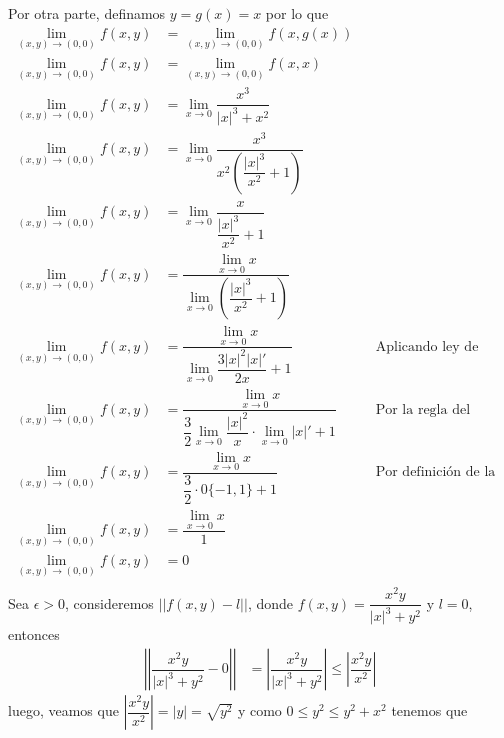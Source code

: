 \documentclass[letterpaper]{article}
\providecommand{\abs}[1]{\left|#1\right|}
\providecommand{\norm}[1]{\left|\left|#1\right|\right|}
\renewcommand{\*}{\cdot}
\theoremstyle{definition}
\begin{document}
Por otra parte, definamos $ y = g(x) = x$ por lo que
\begin{align*}
	\lim\limits_{(x,y)\to (0,0)} f(x,y) &= \lim\limits_{(x,y) \to (0,0)} f(x,g(x))\\
	\lim\limits_{(x,y)\to (0,0)} f(x,y) &= \lim\limits_{(x,y) \to (0,0)} f(x,x)\\
	\lim\limits_{(x,y)\to (0,0)} f(x,y) &= \lim\limits_{x \to 0} \dfrac{x^3}{\vert x \vert^3 + x^2} \\
	\lim\limits_{(x,y)\to (0,0)} f(x,y) &= \lim\limits_{x \to 0} \dfrac{x^3}{x^2  \left( \dfrac{\abs{x}^3}{x^2} + 1 \right) } \\
	\lim\limits_{(x,y)\to (0,0)} f(x,y) &= \lim\limits_{x \to 0} \dfrac{x}{\dfrac{\abs{x}^3}{x^2} + 1 } \\
	\lim\limits_{(x,y)\to (0,0)} f(x,y) &=  \dfrac{\lim\limits_{x \to 0} x}{\lim\limits_{x \to 0} \left( \dfrac{\abs{x}^3}{x^2} + 1 \right) } \\
	\lim\limits_{(x,y)\to (0,0)} f(x,y) &=  \dfrac{\lim\limits_{x \to 0} x}{\lim\limits_{x \to 0}  \dfrac{3\abs{x}^2 \abs{x}'}{2x} + 1  }  && \text{Aplicando ley de L'Hôpital}\\
	\lim\limits_{(x,y)\to (0,0)} f(x,y) &=  \dfrac{\lim\limits_{x \to 0} x}{ \dfrac{3}{2} \lim\limits_{x \to 0}  \dfrac{\abs{x}^2}{x}\* \lim\limits_{x \to 0} \abs{x}'  + 1  }  && \text{Por la regla del producto}\\
	\lim\limits_{(x,y)\to (0,0)} f(x,y) &=  \dfrac{\lim\limits_{x \to 0} x}{ \dfrac{3}{2} \* 0\{-1,1\}  + 1  }  && \text{Por definición de la derivada del valor absoluto }\\
	\lim\limits_{(x,y)\to (0,0)} f(x,y) &=  \dfrac{\lim\limits_{x \to 0} x}{1}  && \text{}\\
	\lim\limits_{(x,y)\to (0,0)} f(x,y) &=  0 && \text{}\\
\end{align*}
Sea $ \epsilon > 0 $, consideremos $ \norm{f(x,y) - l} $, donde $ f(x,y) = \dfrac{x^2y}{\vert x \vert^3 + y^2} $ y $ l = 0 $, entonces
\begin{align*}
	\norm{\dfrac{x^2y}{\vert x \vert^3 + y^2} - 0} &= \abs{\dfrac{x^2y}{\vert x \vert^3 + y^2}} \leq \abs{\dfrac{x^2y}{x^2}}
\end{align*}
luego, veamos que $ \abs{\dfrac{x^2y}{x^2}} = \abs{y} = \sqrt{y^2} $ y como $ 0 \leq y^2 \leq y^2 + x^2 $ tenemos que
\end{document}
